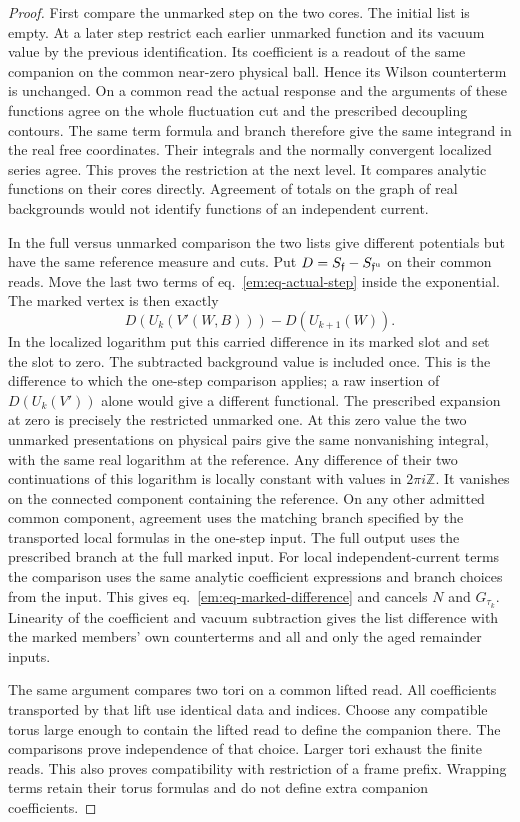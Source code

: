 \documentclass[11pt,letterpaper,reqno]{amsart}
\numberwithin{equation}{section}
\renewcommand{\eqref}[1]{\textup{eq.~\ref{#1}}}
\theoremstyle{definition}
\theoremstyle{remark}
\begin{document}
\begin{proof}
First compare the unmarked step on the two cores. The initial list is
empty. At a later step restrict each earlier unmarked function and its
vacuum value by the previous identification. Its coefficient is a
readout of the same companion on the common near-zero physical ball.
Hence its
Wilson counterterm is unchanged. On a common read the actual response
and the arguments of these functions agree on the whole fluctuation
cut and the prescribed decoupling contours. The same term formula and
branch therefore give the same integrand in the real free coordinates.
Their integrals and the normally convergent localized series agree. This
proves the restriction at the next level. It compares analytic functions
on their cores directly. Agreement of totals on the graph of real
backgrounds would not identify functions of an independent current.

In the full versus unmarked comparison the two lists give different
potentials but have the same reference measure and cuts. Put
$D=S_{\mathfrak f}-S_{\mathfrak f^{\rm u}}$ on their common reads.
Move the last two terms of \eqref{em:eq-actual-step} inside the
exponential. The marked vertex is then exactly
\[
             D(U_k(V'(W,B)))-D(U_{k+1}(W)).
\]
In the localized logarithm put this carried difference in its marked
slot and set the slot to zero. The subtracted background value is
included once. This is the difference to which the one-step comparison
applies; a raw insertion of $D(U_k(V'))$ alone would give a different
functional. The prescribed
expansion at zero is precisely the restricted unmarked one. At this
zero value the two unmarked presentations on physical pairs give the
same nonvanishing integral, with the same real logarithm at the
reference. Any difference of their two continuations of this logarithm
is locally constant with values in $2\pi i\mathbb Z$. It vanishes on
the connected component containing the reference. On any other
admitted common component, agreement uses the matching branch
specified by the transported local formulas in the one-step input. The full output uses the prescribed branch at the full
marked input. For local independent-current terms the comparison uses
the same analytic coefficient expressions and branch choices from the
input. This gives \eqref{em:eq-marked-difference} and cancels $N$ and
$G_{\tau_k}$. Linearity of the coefficient and vacuum subtraction gives
the list difference with the marked members' own counterterms and all
and only the aged remainder inputs.

The same argument compares two tori on a common lifted read. All
coefficients transported by that lift use identical data and indices.
Choose any compatible torus large enough to contain the lifted read
to define the companion there. The comparisons prove independence of
that choice. Larger tori exhaust the finite reads. This also proves
compatibility with restriction of a frame prefix. Wrapping terms retain
their torus formulas and do not define extra companion coefficients.
\end{proof}
\end{document}
